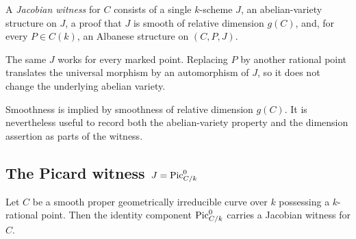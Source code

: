 \begin{definition}\label{mk-def:JacobianWitness}
  \leanok

  A \emph{Jacobian witness} for \(C\) consists of a single \(k\)-scheme \(J\),
  an abelian-variety structure on \(J\), a proof that \(J\) is smooth of
  relative dimension \(g(C)\), and, for every \(P\in C(k)\), an Albanese
  structure on \((C,P,J)\).
\end{definition}

\begin{remark}
  \label{mk-rem:JacobianWitness_quantifier_order}
  The same \(J\) works for every marked point.  Replacing \(P\) by another
  rational point translates the universal morphism by an automorphism of
  \(J\), so it does not change the underlying abelian variety.
\end{remark}

\begin{remark}
  \label{mk-rem:JacobianWitness_smooth_redundancy}
  Smoothness is implied by smoothness of relative dimension \(g(C)\).  It is
  nevertheless useful to record both the abelian-variety property and the
  dimension assertion as parts of the witness.
\end{remark}

\subsection{The Picard witness \(J=\operatorname{Pic}^0_{C/k}\)}
\label{mk-sec:picardJacobianWitness}

\begin{theorem}
  \label{mk-def:picardJacobianWitnessOfHasRationalPoint}

  Let \(C\) be a smooth proper geometrically irreducible curve over \(k\)
  possessing a \(k\)-rational point. Then the identity component
  \(\operatorname{Pic}^0_{C/k}\) carries a Jacobian witness for \(C\).
\end{theorem}

